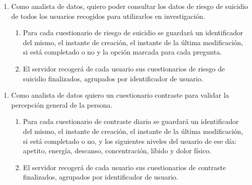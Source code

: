         \begin{enumerate}[resume=req-usuario,label=\textbf{\texttt{RU-\arabic*}}]
            \item Como analista de datos, quiero poder consultar los datos de riesgo de suicidio  de todos los usuarios recogidos para utilizarlos en investigación.
            \begin{enumerate}[resume=req-funcionales,label=\textbf{\texttt{RF-\arabic*}}]
                \item Para cada cuestionario de riesgo de suicidio se guardará un identificador del mismo, el instante de creación, el instante de la última modificación, si está completado o no y la opción marcada para cada pregunta.
                \item El servidor recogerá de cada usuario sus cuestionarios de riesgo de suicidio finalizados, agrupados por identificador de usuario.
            \end{enumerate}
        \end{enumerate}
        \begin{enumerate}[resume=req-usuario,label=\textbf{\texttt{RU-\arabic*}}]
            \item Como analista de datos quiero un cuestionario contraste para validar la percepción general de la persona.
            \begin{enumerate}[resume=req-funcionales,label=\textbf{\texttt{RF-\arabic*}}]
                \item Para cada cuestionario de contraste diario se guardará un identificador del mismo, el instante de creación, el instante de la última modificación, si está completado o no, y los siguientes niveles del usuario de ese día: apetito, energía, descanso, concentración, líbido y dolor físico. 
                \item El servidor recogerá de cada usuario sus cuestionarios de contraste finalizados, agrupados por identificador de usuario.
            \end{enumerate}
        \end{enumerate}
